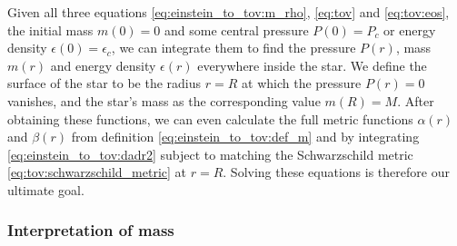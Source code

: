 Given all three equations \eqref{eq:einstein_to_tov:m_rho}, \eqref{eq:tov} and \eqref{eq:tov:eos}, the initial mass $m(0) = 0$ and some central pressure $P(0) = P_c$ or energy density $\epsilon(0) = \epsilon_c$, we can integrate them to find the pressure $P(r)$, mass $m(r)$ and energy density $\epsilon(r)$ everywhere inside the star.
We define the surface of the star to be the radius $r=R$ at which the pressure $P(r) = 0$ vanishes, and the star's mass as the corresponding value $m(R) = M$.
After obtaining these functions, we can even calculate the full metric functions $\alpha(r)$ and $\beta(r)$ from definition \eqref{eq:einstein_to_tov:def_m} and by integrating \cref{eq:einstein_to_tov:dadr2} subject to matching the Schwarzschild metric \eqref{eq:tov:schwarzschild_metric} at $r=R$.
Solving these equations is therefore our ultimate goal.

\iffalse
For some purposes, such as when analyzing stability of stars in \cref{sec:nstars:stability_general}, it is also useful to obtain the metric function $\alpha(r)$.
Inside the star, note that in both equation \eqref{eq:einstein_to_tov:einstein_equation_in_star} and \eqref{eq:einstein_to_tov:dadr2}, it is only the derivative $\alpha'(r)$ that enters, so the solution is only specified up to a constant.
Outside the star, however, $\alpha(R)$ should match the Schwarzschild metric with
\begin{equation}
	g_{00} = e^{2 \alpha(R)} = 1 - \frac{2 G M }{Rc^2} .
\label{eq:tov:schwarzschild_metric_00_surface}
\end{equation}
To integrate $\alpha(r)$, then, we can simply start with any value such as $\alpha(0) = 0$ at the center, then integrate either \eqref{eq:einstein_to_tov:dadr1} or \eqref{eq:einstein_to_tov:dadr2} with the \emph{known} right sides out to the surface $r=R$ and finally shift all values of $\alpha(r)$ by
\begin{equation}
	\alpha(r) \rightarrow \alpha(r) - \alpha(R) + \frac12 \log \left( 1 - \frac{2 G M }{ R c^2} \right)
\end{equation}
to match the Schwarzschild metric element \eqref{eq:tov:schwarzschild_metric_00_surface}.
This is completely equivalent to instead setting $\alpha(R) = \log \left(1 - 2 G M / R c^2 \right) / 2$ and integrating $\odv{\alpha(r)}/{r}$ backwards from the surface $r=R$ into the center $r=0$, but the former method can be more natural to implement from a numerical perspective.
\fi

\subsubsection{Interpretation of mass}

